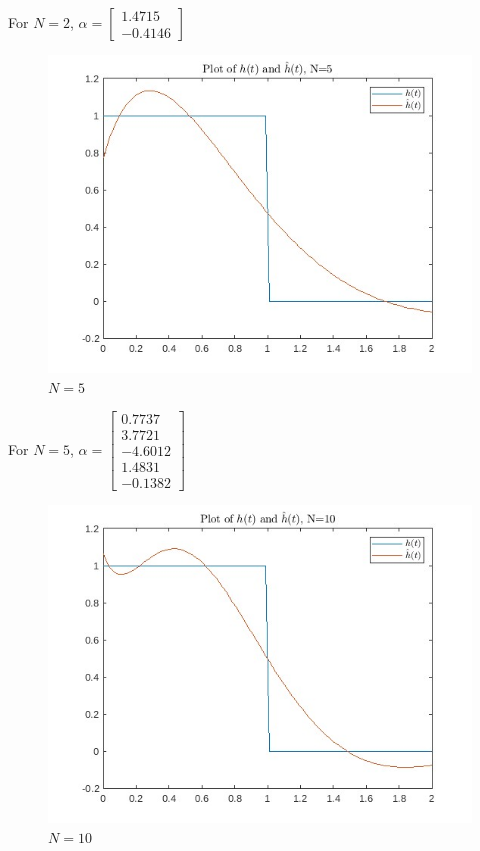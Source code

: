\documentclass[12pt]{article}
\begin{document}
\begin{enumerate}
\begin{framed}
For $N=2$, $\alpha=\begin{bmatrix}
    1.4715 \\ -0.4146
\end{bmatrix}$
\end{framed}

\begin{figure}[h]
    \caption{$N=5$}
    \centering
    \includegraphics[scale=0.4]{3-2_b.jpg}
\end{figure}

\begin{framed}
For $N=5$, $\alpha=\begin{bmatrix}
    0.7737 \\ 3.7721 \\ -4.6012 \\ 1.4831 \\ -0.1382
\end{bmatrix}$
\end{framed}

\begin{figure}[h]
    \caption{$N=10$}
    \centering
    \includegraphics[scale=0.4]{3-2_c.jpg}
\end{figure}


\end{enumerate}
\end{document}
